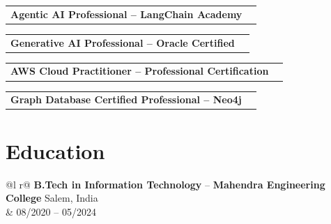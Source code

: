 \documentclass[a4paper,1pt]{article}
\begin{document}
\begin{tabularx}{\linewidth}{ @{}l r@{} }
\textbf{Agentic AI Professional -- LangChain Academy} & \hfill
\end{tabularx}

\begin{tabularx}{\linewidth}{ @{}l r@{} }
\textbf{Generative AI Professional -- Oracle Certified} & \hfill
\end{tabularx}

\begin{tabularx}{\linewidth}{ @{}l r@{} }
\textbf{AWS Cloud Practitioner -- Professional Certification} & \hfill
\end{tabularx}

\begin{tabularx}{\linewidth}{ @{}l r@{} }
\textbf{Graph Database Certified Professional -- Neo4j} & \hfill
\end{tabularx}

\section{Education}
\begin{tabularx}{\linewidth}{ @{}l r@{} }
\textbf{B.Tech in Information Technology} -- \textbf{Mahendra Engineering College} \hfill Salem, India \\
& \hfill 08/2020 -- 05/2024 \\[3.75pt]
\\
\end{tabularx}
\end{document}
